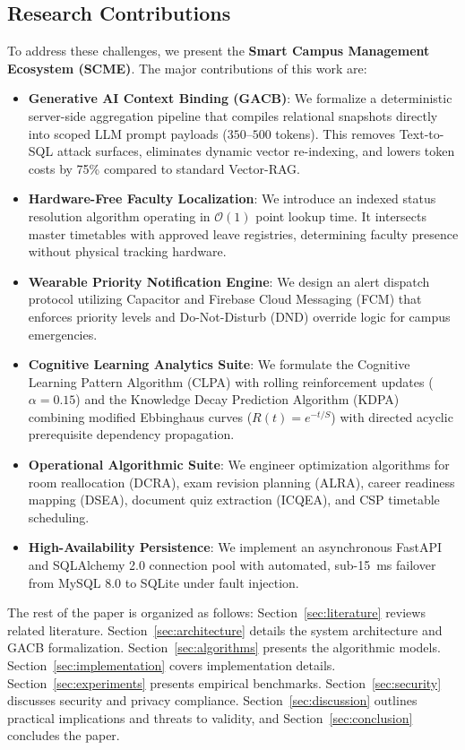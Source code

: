 \documentclass[conference]{IEEEtran}
\begin{document}
\subsection{Research Contributions}
To address these challenges, we present the \textbf{Smart Campus Management Ecosystem (SCME)}. The major contributions of this work are:
\begin{itemize}
    \item \textbf{Generative AI Context Binding (GACB)}: We formalize a deterministic server-side aggregation pipeline that compiles relational snapshots directly into scoped LLM prompt payloads ($350$--$500$ tokens). This removes Text-to-SQL attack surfaces, eliminates dynamic vector re-indexing, and lowers token costs by 75\% compared to standard Vector-RAG.
    \item \textbf{Hardware-Free Faculty Localization}: We introduce an indexed status resolution algorithm operating in $\mathcal{O}(1)$ point lookup time. It intersects master timetables with approved leave registries, determining faculty presence without physical tracking hardware.
    \item \textbf{Wearable Priority Notification Engine}: We design an alert dispatch protocol utilizing Capacitor and Firebase Cloud Messaging (FCM) that enforces priority levels and Do-Not-Disturb (DND) override logic for campus emergencies.
    \item \textbf{Cognitive Learning Analytics Suite}: We formulate the Cognitive Learning Pattern Algorithm (CLPA) with rolling reinforcement updates ($\alpha = 0.15$) and the Knowledge Decay Prediction Algorithm (KDPA) combining modified Ebbinghaus curves ($R(t) = e^{-t/S}$) with directed acyclic prerequisite dependency propagation.
    \item \textbf{Operational Algorithmic Suite}: We engineer optimization algorithms for room reallocation (DCRA), exam revision planning (ALRA), career readiness mapping (DSEA), document quiz extraction (ICQEA), and CSP timetable scheduling.
    \item \textbf{High-Availability Persistence}: We implement an asynchronous FastAPI and SQLAlchemy 2.0 connection pool with automated, sub-15~ms failover from MySQL 8.0 to SQLite under fault injection.
\end{itemize}

The rest of the paper is organized as follows: Section~\ref{sec:literature} reviews related literature. Section~\ref{sec:architecture} details the system architecture and GACB formalization. Section~\ref{sec:algorithms} presents the algorithmic models. Section~\ref{sec:implementation} covers implementation details. Section~\ref{sec:experiments} presents empirical benchmarks. Section~\ref{sec:security} discusses security and privacy compliance. Section~\ref{sec:discussion} outlines practical implications and threats to validity, and Section~\ref{sec:conclusion} concludes the paper.
\end{document}
